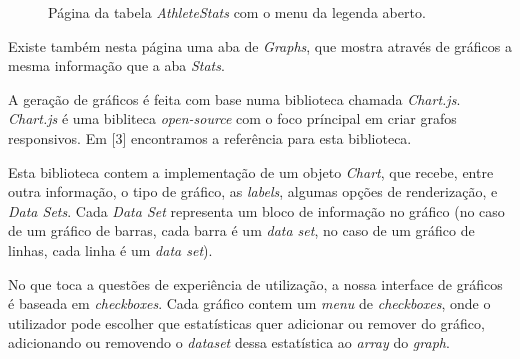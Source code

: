 \begin{figure}[h]
	\begin{center}
	\end{center}
	\caption{Página da tabela \textit{AthleteStats} com o menu da legenda aberto.}\label{fig:athleteprofile}
\end{figure}

Existe também nesta página uma aba de \textit{Graphs}, que mostra através de gráficos a mesma informação que a aba \textit{Stats}.

A geração de gráficos é feita com base numa biblioteca chamada \textit{Chart.js}. \textit{Chart.js} é uma bibliteca \textit{open-source} com o foco príncipal em criar grafos responsivos. Em [3] encontramos a referência para esta biblioteca. 

Esta biblioteca contem a implementação de um objeto \textit{Chart}, que recebe, entre outra informação, o tipo de gráfico, as \textit{labels}, algumas opções de renderização, e \textit{Data Sets}. Cada \textit{Data Set} representa um bloco de informação no gráfico (no caso de um gráfico de barras, cada barra é um \textit{data set}, no caso de um gráfico de linhas, cada linha é um \textit{data set}).

No que toca a questões de experiência de utilização, a nossa interface de gráficos é baseada em \textit{checkboxes}. Cada gráfico contem um \textit{menu} de \textit{checkboxes}, onde o utilizador pode escolher que estatísticas quer adicionar ou remover do gráfico, adicionando ou removendo o \textit{dataset} dessa estatística ao \textit{array} do \textit{graph}. 

